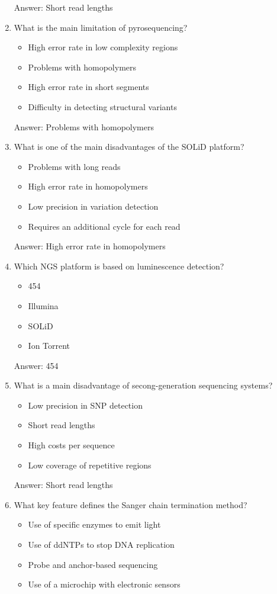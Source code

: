 \begin{enumerate}
Answer: Short read lengths

\item What is the main limitation of pyrosequencing?
\begin{itemize}
\item High error rate in low complexity regions
\item Problems with homopolymers
\item High error rate in short segments
\item Difficulty in detecting structural variants
\end{itemize}

Answer: Problems with homopolymers

\item What is one of the main disadvantages of the SOLiD platform?
\begin{itemize}
\item Problems with long reads
\item High error rate in homopolymers
\item Low precision in variation detection
\item Requires an additional cycle for each read
\end{itemize}

Answer: High error rate in homopolymers

\item Which NGS platform is based on luminescence detection?
\begin{itemize}
\item 454
\item Illumina
\item SOLiD
\item Ion Torrent
\end{itemize}

Answer: 454

\item What is a main disadvantage of secong-generation sequencing systems?
\begin{itemize}
\item Low precision in SNP detection
\item Short read lengths
\item High costs per sequence
\item Low coverage of repetitive regions
\end{itemize}

Answer: Short read lengths

\item What key feature defines the Sanger chain termination method?
\begin{itemize}
\item Use of specific enzymes to emit light
\item Use of ddNTPs to stop DNA replication
\item Probe and anchor-based sequencing
\item Use of a microchip with electronic sensors
\end{itemize}


\end{enumerate}
